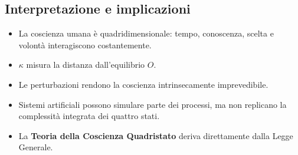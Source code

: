 \documentclass[12pt,a4paper]{article}
\begin{document}
\subsection{Interpretazione e implicazioni}

\begin{itemize}
    \item La coscienza umana è quadridimensionale: tempo, conoscenza, scelta e volontà interagiscono costantemente.
    \item $\kappa$ misura la distanza dall’equilibrio $O$.
    \item Le perturbazioni rendono la coscienza intrinsecamente imprevedibile.
    \item Sistemi artificiali possono simulare parte dei processi, ma non replicano la complessità integrata dei quattro stati.
    \item La \textbf{Teoria della Coscienza Quadristato} deriva direttamente dalla Legge Generale.
\end{itemize}
\end{document}
